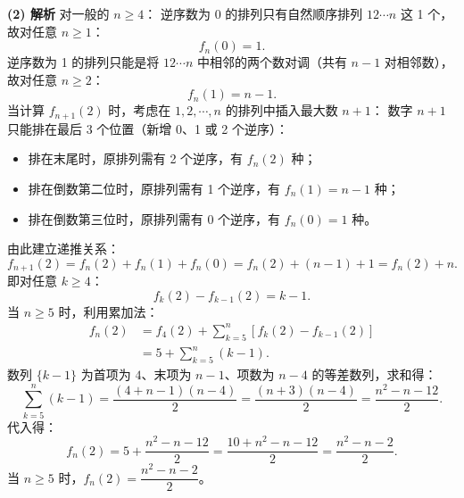 \begin{answer}
\textbf{(2) 解析}
对一般的 $n \geqslant 4$：
逆序数为 0 的排列只有自然顺序排列 $12\cdots n$ 这 1 个，故对任意 $n \geqslant 1$：
\nopagebreak[4]
\[f_n(0) = 1.\]
逆序数为 1 的排列只能是将 $12\cdots n$ 中相邻的两个数对调（共有 $n - 1$ 对相邻数），故对任意 $n \geqslant 2$：
\nopagebreak[4]
\[f_n(1) = n - 1.\]
当计算 $f_{n+1}(2)$ 时，考虑在 $1, 2, \cdots, n$ 的排列中插入最大数 $n + 1$：
数字 $n + 1$ 只能排在最后 3 个位置（新增 0、1 或 2 个逆序）：
\begin{itemize}
\item 排在末尾时，原排列需有 2 个逆序，有 $f_n(2)$ 种；
\item 排在倒数第二位时，原排列需有 1 个逆序，有 $f_n(1) = n - 1$ 种；
\item 排在倒数第三位时，原排列需有 0 个逆序，有 $f_n(0) = 1$ 种。
\end{itemize}
由此建立递推关系：
\nopagebreak[4]
\[f_{n+1}(2) = f_n(2) + f_n(1) + f_n(0) = f_n(2) + (n - 1) + 1 = f_n(2) + n.\]
即对任意 $k \geqslant 4$：
\nopagebreak[4]
\[f_{k}(2) - f_{k-1}(2) = k - 1.\]
当 $n \geqslant 5$ 时，利用累加法：
\nopagebreak[4]
\[\begin{aligned}
f_n(2) &= f_4(2) + \sum_{k=5}^n \left[f_k(2) - f_{k-1}(2)\right] \\
&= 5 + \sum_{k=5}^n (k - 1).
\end{aligned}\]
数列 $\{k - 1\}$ 为首项为 $4$、末项为 $n - 1$、项数为 $n - 4$ 的等差数列，求和得：
\nopagebreak[4]
\[\sum_{k=5}^n (k - 1) = \frac{(4 + n - 1)(n - 4)}{2} = \frac{(n + 3)(n - 4)}{2} = \frac{n^2 - n - 12}{2}.\]
代入得：
\nopagebreak[4]
\[f_n(2) = 5 + \frac{n^2 - n - 12}{2} = \frac{10 + n^2 - n - 12}{2} = \frac{n^2 - n - 2}{2}.\]
当 $n \geqslant 5$ 时，$f_n(2) = \dfrac{n^2 - n - 2}{2}$。



\end{answer}